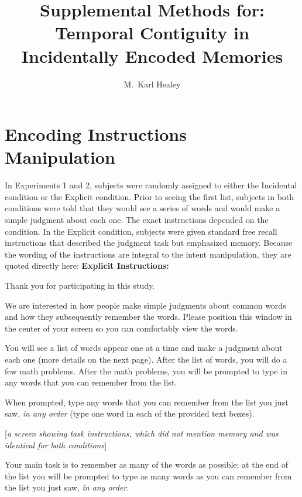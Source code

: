 \documentclass[man,natbib,floatsintext]{apa6} %
\title{Supplemental Methods for: Temporal Contiguity in Incidentally Encoded Memories}
\author{M.\ Karl Healey}
\affiliation{Michigan State University}
\begin{document}
\maketitle


\newcommand\listlength{16} %
\newcommand\presrate{4 seconds} %
\newcommand\isi{1 second} %
\newcommand\DFRDelay{16 seconds} %
\newcommand\recalltime{75 seconds} %
\newcommand\totalss{XX}
\newcommand\totalexcluded{XX}

\section{Encoding Instructions Manipulation} In Experiments 1 and 2, subjects were randomly assigned to either the Incidental condition or the Explicit condition. Prior to seeing the first list, subjects in both conditions were told that they would see a series of words and would make a simple judgment about each one. The exact instructions depended on the condition. In the Explicit condition, subjects were given standard free recall instructions that described the judgment task but emphasized memory. Because the wording of the instructions are integral to the intent manipulation, they are quoted directly here:
\textbf{Explicit Instructions:}

\begin{displayquote}
        Thank you for participating in this study. 

        We are interested in how people make simple judgments about common words and
        how they subsequently remember the words. Please position this window in the center
        of your screen so you can comfortably view the words.

        You will see a list of words appear one at a time and make a judgment about each one
        (more details on the next page). After the list of words, you will do a few math problems.
        After the math problems, you will be prompted to type in any words that you can remember
        from the list.

        When prompted, type any words that you can remember from the list you just saw,
        \emph{in any order} (type one word in each of the provided text boxes).

    [\textit{a screen showing task instructions, which did not mention memory and was identical for both conditions}]

        Your main task is to remember as many of the words as possible; at the end of the list you will be prompted to
    type as many words as you can remember from the list you just saw, \emph{in any order}.
\end{displayquote}
\end{document}
